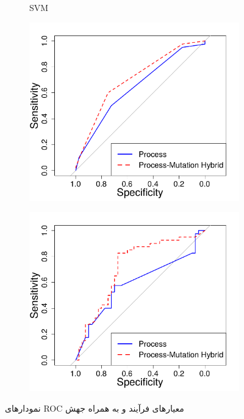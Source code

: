 \begin{figure}[H]
\begin{subfigure}{.5\textwidth}
		\caption{SVM}
	\end{subfigure}
	\begin{subfigure}{.5\textwidth}
		\centering
		\includegraphics[width= \linewidth]{img/evaluation/phase3-roc-lr.pdf}
		\caption{}
	\end{subfigure}
	\begin{subfigure}{.5\textwidth}
		\centering
		\includegraphics[width= \linewidth]{img/evaluation/phase3-roc-nn.pdf}
		\caption{}
	\end{subfigure}
	\caption{نمودارهای ROC معیارهای فرآیند و به همراه جهش}
	\label{fig:ROC-phase3}
\end{figure}

